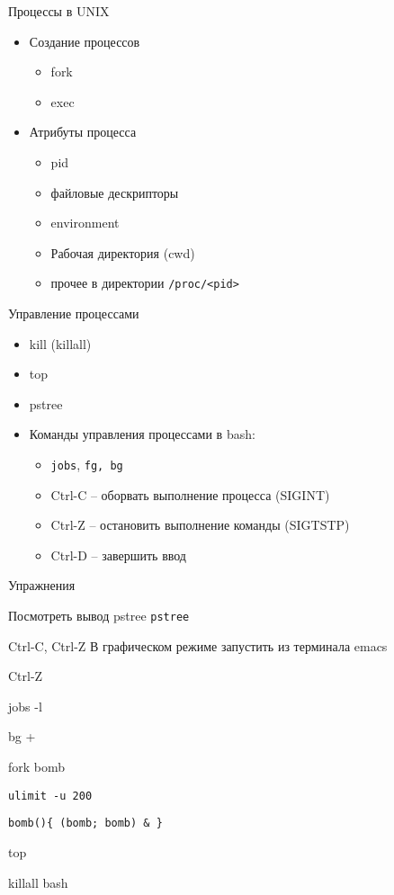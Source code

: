 \begin{frame}{Процессы в UNIX}
  \begin{itemize}
    \item Создание процессов
      \begin{itemize}
        \item fork
        \item exec
      \end{itemize}
    \item Атрибуты процесса
      \begin{itemize}
        \item pid 
        \item файловые дескрипторы
        \item environment
        \item Рабочая директория (cwd)
        \item прочее в директории {\tt /proc/<pid>}
      \end{itemize}
  \end{itemize}
\end{frame}

\begin{frame}{Управление процессами}
  \begin{itemize}
    \item kill (killall)
    \item top
    \item pstree
    \item Команды управления процессами в bash: 
      \begin{itemize}
        \item {\tt jobs}, {\tt fg, \tt bg}
        \item Ctrl-C -- оборвать выполнение процесса (SIGINT)
        \item Ctrl-Z -- остановить выполнение команды (SIGTSTP)
        \item Ctrl-D -- завершить ввод
      \end{itemize}
  \end{itemize}
\end{frame}


\begin{frame}{Упражнения}
  \begin{block}{Посмотреть вывод pstree}
    {\tt pstree}
  \end{block}
  \pause
  \begin{block}{Ctrl-C, Ctrl-Z}
    В графическом режиме запустить из терминала emacs

    Ctrl-Z

    jobs -l

    bg +
  \end{block}
  \pause
  \begin{block}{fork bomb}

    {\tt ulimit -u 200} 

    {\tt bomb()\{ (bomb; bomb) \& \} }

    top

    killall bash

  \end{block}
\end{frame}

